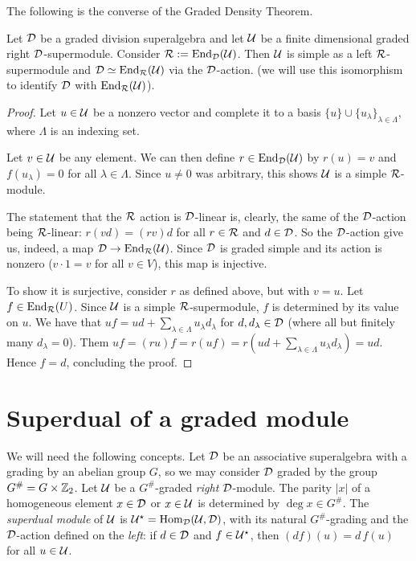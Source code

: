 \documentclass{amsbook}
\begin{document}
The following is the converse of the Graded Density Theorem.

\begin{prop}\label{prop:converse-density-thm}
    Let $\mathcal{D}$ be a graded division superalgebra and let $\mathcal U$ be a finite dimensional graded right $\mathcal{D}$-supermodule. Consider $\mathcal R := \operatorname{End}_{\mathcal{D}} (\mathcal U)$. Then $\mathcal U$ is simple as a left $\mathcal R$-supermodule and $\mathcal{D} \simeq \operatorname{End}_{\mathcal R} (\mathcal U)$ via the $\mathcal{D}$-action.
    (we will use this isomorphism to identify $\mathcal{D}$ with $\operatorname{End}_{\mathcal R} (\mathcal U)$). 
\end{prop}

\begin{proof}
Let $u \in \mathcal U$ be a nonzero vector and complete it to a basis $\{u\} \cup \{ u_\lambda\}_{\lambda \in \Lambda}$, where $\Lambda$ is an indexing set.

Let $v\in \mathcal U$ be any element. We can then define $r\in \operatorname{End}_{\mathcal{D}} (\mathcal U)$ by $r(u) = v$ and $f(u_\lambda) = 0$ for all $\lambda \in \Lambda$. Since $u \neq 0$ was arbitrary, this shows $\mathcal U$ is a simple $\mathcal R$-module. 

The statement that the $\mathcal R$ action is $\mathcal{D}$-linear is, clearly, the same of the $\mathcal{D}$-action being $\mathcal R$-linear: $r(vd) = (rv)d$ for all $r\in \mathcal R$ and $d \in \mathcal{D}$. So the $\mathcal{D}$-action give us, indeed, a map $\mathcal{D} \to \operatorname{End}_{\mathcal R} (\mathcal U)$.
Since $\mathcal{D}$ is graded simple and its action is nonzero ($v\cdot 1 = v$ for all $v \in V$), this map is injective.

To show it is surjective, consider $r$ as defined above, but with $v = u$. Let $f\in \operatorname{End}_{\mathcal R} (U)$. Since $\mathcal U$ is a simple $\mathcal R$-supermodule, $f$ is determined by its value on $u$.
We have that $uf = u d + \sum_{\lambda \in \Lambda} u_\lambda d_\lambda$ for $d, d_\lambda \in \mathcal{D}$ (where all but finitely many $d_\lambda = 0$). 
Them $ uf = (ru)f = r(uf) = r(ud + \sum_{\lambda \in \Lambda} u_\lambda d_\lambda )  = ud$. Hence $f = d$, concluding the proof.
\end{proof}

\section{Superdual of a graded module}\label{ssec:superdual}

We will need the following concepts. Let $\mathcal{D}$ be an associative superalgebra with a grading by an abelian group $G$, so we may consider $\mathcal{D}$ graded by the group $G^\# = G\times \mathbb{Z}_2$. Let $\mathcal U$ be a $G^\#$-graded \emph{right} $\mathcal{D}$-module. The parity $|x|$ of a homogeneous element $x \in \mathcal{D}$ or $x\in \mathcal U$ is determined by $\deg x \in G^\#$. The \emph{superdual module} of $\mathcal U$ is $\mathcal U^\star = \operatorname{Hom}_{\mathcal{D}} (\mathcal U,\mathcal{D})$, with its natural $G^\#$-grading and the $\mathcal{D}$-action defined on the \emph{left}: if $d \in \mathcal{D}$ and $f \in \mathcal U ^\star$, then $(df)(u) = d\, f(u)$ for all $u\in \mathcal U$.
\end{document}

